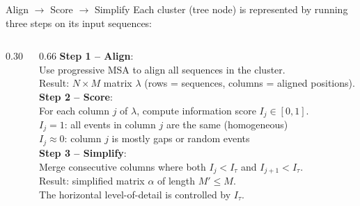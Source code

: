 \documentclass[aspectratio=169,t]{beamer}
\begin{document}
\begin{frame}[shrink=5]{Align $\to$ Score $\to$ Simplify}
    Each cluster (tree node) is represented by running three steps on its input sequences:
    \vspace{0.3cm}
    \begin{columns}[T]
      \begin{column}{0.30\textwidth}
        \begin{center}
        \end{center}
      \end{column}
      \begin{column}{0.66\textwidth}
        \textbf{Step 1 -- Align}:\\
        Use progressive MSA to align all sequences in the cluster.\\
        Result: $N \times M$ matrix $\lambda$ (rows = sequences, columns = aligned positions).\\[0.25cm]
        \textbf{Step 2 -- Score}:\\
        For each column $j$ of $\lambda$, compute information score $I_j \in [0,1]$.\\
        $I_j = 1$: all events in column $j$ are the same \quad (homogeneous)\\
        $I_j \approx 0$: column $j$ is mostly gaps or random events\\[0.25cm]
        \textbf{Step 3 -- Simplify}:\\
        Merge consecutive columns where both $I_j < I_\tau$ and $I_{j+1} < I_\tau$.\\
        Result: simplified matrix $\alpha$ of length $M' \leq M$.\\
        The horizontal level-of-detail is controlled by $I_\tau$.
      \end{column}
    \end{columns}
  \end{frame}
  
\end{document}
